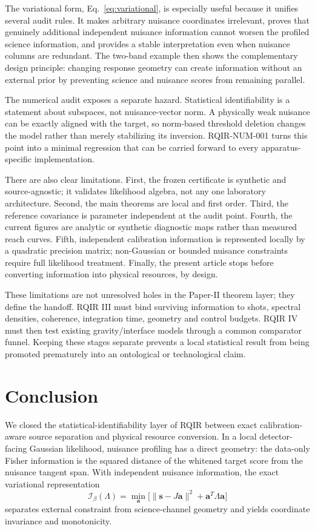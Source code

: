 The variational form, Eq.~\eqref{eq:variational}, is especially useful because it unifies several audit rules. It makes arbitrary nuisance coordinates irrelevant, proves that genuinely additional independent nuisance information cannot worsen the profiled science information, and provides a stable interpretation even when nuisance columns are redundant. The two-band example then shows the complementary design principle: changing response geometry can create information without an external prior by preventing science and nuisance scores from remaining parallel.

The numerical audit exposes a separate hazard. Statistical identifiability is a statement about subspaces, not nuisance-vector norm. A physically weak nuisance can be exactly aligned with the target, so norm-based threshold deletion changes the model rather than merely stabilizing its inversion. RQIR-NUM-001 turns this point into a minimal regression that can be carried forward to every apparatus-specific implementation.

There are also clear limitations. First, the frozen certificate is synthetic and source-agnostic; it validates likelihood algebra, not any one laboratory architecture. Second, the main theorems are local and first order. Third, the reference covariance is parameter independent at the audit point. Fourth, the current figures are analytic or synthetic diagnostic maps rather than measured reach curves. Fifth, independent calibration information is represented locally by a quadratic precision matrix; non-Gaussian or bounded nuisance constraints require full likelihood treatment. Finally, the present article stops before converting information into physical resources, by design.

These limitations are not unresolved holes in the Paper-II theorem layer; they define the handoff. RQIR III must bind surviving information to shots, spectral densities, coherence, integration time, geometry and control budgets. RQIR IV must then test existing gravity/interface models through a common comparator funnel. Keeping these stages separate prevents a local statistical result from being promoted prematurely into an ontological or technological claim.

\section{Conclusion}
\label{sec:conclusion}

We closed the statistical-identifiability layer of RQIR between exact calibration-aware source separation and physical resource conversion. In a local detector-facing Gaussian likelihood, nuisance profiling has a direct geometry: the data-only Fisher information is the squared distance of the whitened target score from the nuisance tangent span. With independent nuisance information, the exact variational representation
\begin{equation}
 \mathcal I_\beta(\Lambda)=\min_{\bm a}
 \bigl[\|\bm s-J\bm a\|^2+\bm a^T\Lambda\bm a\bigr]
\end{equation}
separates external constraint from science-channel geometry and yields coordinate invariance and monotonicity.

